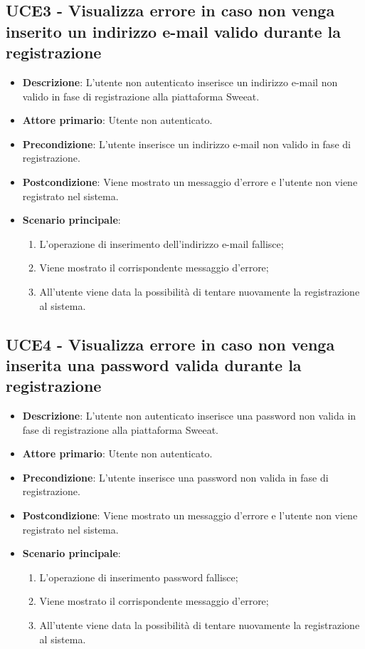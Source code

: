 \subsection{UCE3 - Visualizza errore in caso non venga inserito un indirizzo e-mail valido durante la registrazione}
\begin{itemize}
\item \textbf{Descrizione}: L'utente non autenticato inserisce un indirizzo e-mail non valido in fase di registrazione alla piattaforma Sweeat.
\item \textbf{Attore primario}: Utente non autenticato.
\item \textbf{Precondizione}: L'utente inserisce un indirizzo e-mail non valido in fase di registrazione.
\item \textbf{Postcondizione}: Viene mostrato un messaggio d'errore e l'utente non viene registrato nel sistema.

\item \textbf{Scenario principale}:
\begin{enumerate}
\item L'operazione di inserimento dell'indirizzo e-mail fallisce;
\item Viene mostrato il corrispondente messaggio d'errore;
\item All'utente viene data la possibilità di tentare nuovamente la registrazione al sistema.
\end{enumerate}
\end{itemize}

\subsection{UCE4 - Visualizza errore in caso non venga inserita una password valida durante la registrazione}
\begin{itemize}
\item \textbf{Descrizione}: L'utente non autenticato inserisce una password non valida in fase di registrazione alla piattaforma Sweeat.
\item \textbf{Attore primario}: Utente non autenticato.
\item \textbf{Precondizione}: L'utente inserisce una password non valida in fase di registrazione.
\item \textbf{Postcondizione}: Viene mostrato un messaggio d'errore e l'utente non viene registrato nel sistema.

\item \textbf{Scenario principale}:
\begin{enumerate}
\item L'operazione di inserimento password fallisce;
\item Viene mostrato il corrispondente messaggio d'errore;
\item All'utente viene data la possibilità di tentare nuovamente la registrazione al sistema.
\end{enumerate}
\end{itemize}